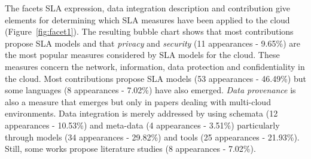 The facets SLA expression, data integration description and contribution give elements for determining which SLA measures have been applied to the cloud (Figure~\ref{fig:facet1}). 
The resulting bubble chart shows that most contributions propose SLA models and that  \textit{privacy}
and \textit{security} (11 appearances - 9.65\%) are the most popular measures considered by SLA models for the cloud. These measures concern the network, information, data protection and confidentiality in the cloud. Most contributions propose SLA models (53 appearances - 46.49\%)  but some languages (8 appearances - 7.02\%) have also emerged. {\em Data provenance} is also a measure that emerges but only in papers dealing with multi-cloud environments. Data integration is merely addressed by using schemata (12 appearances - 10.53\%)  and meta-data (4 appearances - 3.51\%) particularly through models (34 appearances - 29.82\%) and tools (25 appearances - 21.93\%). Still, some works propose literature studies (8 appearances - 7.02\%).
 



